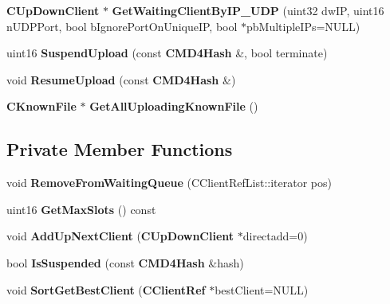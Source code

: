 \begin{DoxyCompactItemize}
\item 
{\bf CUpDownClient} $\ast$ {\bfseries GetWaitingClientByIP\_\-UDP} (uint32 dwIP, uint16 nUDPPort, bool bIgnorePortOnUniqueIP, bool $\ast$pbMultipleIPs=NULL)\label{classCUploadQueue_aebb1ec456ab7d16af80eefaeca759b73}

\item 
uint16 {\bfseries SuspendUpload} (const {\bf CMD4Hash} \&, bool terminate)\label{classCUploadQueue_aa8a1d3809ce9429151a2b27ba0c3eecb}

\item 
void {\bfseries ResumeUpload} (const {\bf CMD4Hash} \&)\label{classCUploadQueue_addae0fa2da657978be3112f294e541b0}

\item 
{\bf CKnownFile} $\ast$ {\bfseries GetAllUploadingKnownFile} ()\label{classCUploadQueue_a29ac6621a27bd839f4dcf34ed8895e09}

\end{DoxyCompactItemize}
\subsection*{Private Member Functions}
\begin{DoxyCompactItemize}
\item 
void {\bfseries RemoveFromWaitingQueue} (CClientRefList::iterator pos)\label{classCUploadQueue_a69107e3a4720ce87e735cccd6d2ea00e}

\item 
uint16 {\bfseries GetMaxSlots} () const \label{classCUploadQueue_a8b87f4af805fe608507e06e63270a20a}

\item 
void {\bfseries AddUpNextClient} ({\bf CUpDownClient} $\ast$directadd=0)\label{classCUploadQueue_a30fbb1d9583e20a31131e77b4b456bf6}

\item 
bool {\bfseries IsSuspended} (const {\bf CMD4Hash} \&hash)\label{classCUploadQueue_a4700ee1df6d4adaf7188f46357e8a870}

\item 
void {\bfseries SortGetBestClient} ({\bf CClientRef} $\ast$bestClient=NULL)\label{classCUploadQueue_a9600420b95d169f25885d7400bdf1c60}

\end{DoxyCompactItemize}
